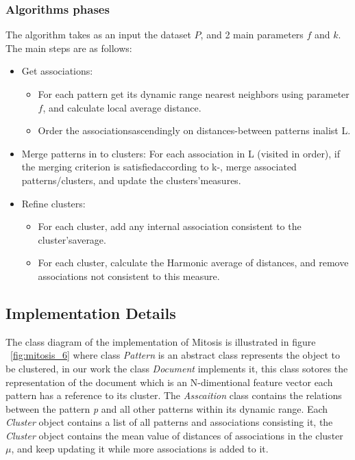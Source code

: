 \subsubsection{Algorithms phases}\label{sec:phases}

The algorithm takes as an input the dataset $P$, and 2 main parameters $f$ and $k$. The main steps are as follows:
\begin{itemize}

\item {Get associations:
\begin{itemize}
	\item For each pattern get its dynamic range nearest neighbors using parameter $f$, and calculate local average distance.
	\item Order the associationsascendingly on distances-between patterns inalist L.
\end{itemize}
}


\item {Merge patterns in to clusters: For each association in L (visited in order), if the merging criterion is satisfiedaccording to k-, merge
associated patterns/clusters, and update the clusters'measures.}
\item {Refine clusters:
\begin{itemize}
\item For each cluster, add any internal association consistent to the cluster'saverage.
\item For each cluster, calculate the Harmonic average of distances, and remove associations not consistent to this measure.
\end{itemize}
}
\end{itemize}


\subsection{Implementation Details}\label{sec:implementation}
The class diagram of the implementation of Mitosis is illustrated in figure ~\ref{fig:mitosis_6} where class \textit{Pattern} is an abstract class represents the object to be clustered, in our work the class \textit{Document} implements it, this class sotores the representation of the document which is an N-dimentional feature vector each pattern has a reference to its cluster.
The \textit{Asscaition} class contains the relations between the pattern \textit{p} and all other patterns within its dynamic range. Each \textit{Cluster} object contains a list of all patterns and associations consisting it, the \textit{Cluster} object contains the mean value of distances of associations in the cluster $\mu$, and keep updating it while more associations is added to it.


